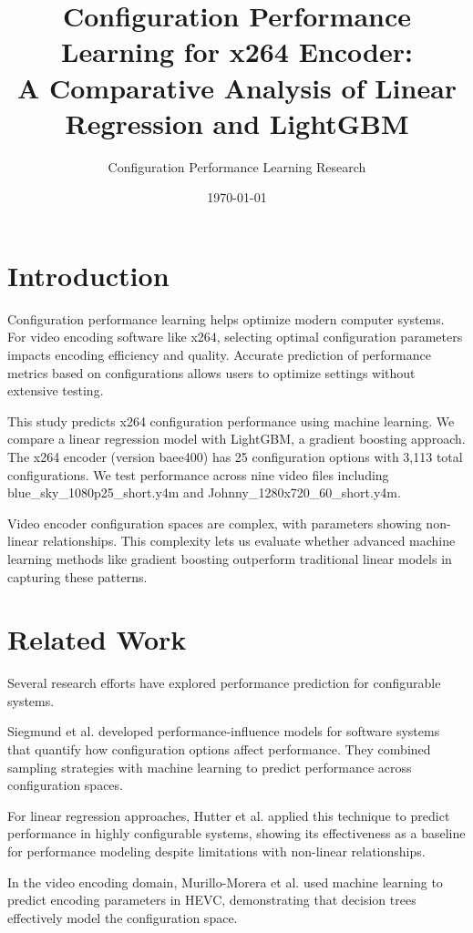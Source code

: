 \documentclass[10pt]{article}
\title{Configuration Performance Learning for x264 Encoder: \\A Comparative Analysis of Linear Regression and LightGBM}
\author{Configuration Performance Learning Research}
\date{\today}
\begin{document}
\maketitle

\section{Introduction}
Configuration performance learning helps optimize modern computer systems. For video encoding software like x264, selecting optimal configuration parameters impacts encoding efficiency and quality. Accurate prediction of performance metrics based on configurations allows users to optimize settings without extensive testing.

This study predicts x264 configuration performance using machine learning. We compare a linear regression model with LightGBM, a gradient boosting approach. The x264 encoder (version baee400) has 25 configuration options with 3,113 total configurations. We test performance across nine video files including blue\_sky\_1080p25\_short.y4m and Johnny\_1280x720\_60\_short.y4m.

Video encoder configuration spaces are complex, with parameters showing non-linear relationships. This complexity lets us evaluate whether advanced machine learning methods like gradient boosting outperform traditional linear models in capturing these patterns.

\section{Related Work}
Several research efforts have explored performance prediction for configurable systems.

Siegmund et al. \cite{siegmund2015performance} developed performance-influence models for software systems that quantify how configuration options affect performance. They combined sampling strategies with machine learning to predict performance across configuration spaces.

For linear regression approaches, Hutter et al. \cite{hutter2011sequential} applied this technique to predict performance in highly configurable systems, showing its effectiveness as a baseline for performance modeling despite limitations with non-linear relationships.

In the video encoding domain, Murillo-Morera et al. \cite{murillo2018performance} used machine learning to predict encoding parameters in HEVC, demonstrating that decision trees effectively model the configuration space.
\end{document}
